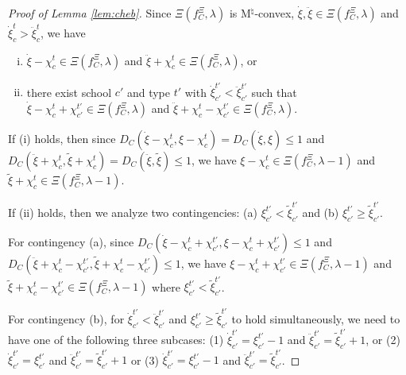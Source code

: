 \documentclass[12pt]{amsart}
\theoremstyle{remark}
\newcommand{\ieh}[1]{{\color{orange} IEH: #1 }}
\newcommand{\fk}[1]{{\color{red} FK: #1 }}
\begin{document}
\begin{proof}[Proof of Lemma \ref{lem:cheb}]
Since $\Xi(f_C^{\Xi},\lambda)$ is M$^{\natural}$-convex, $\dot{\xi}, \ddot{\xi} \in \Xi(f_C^{\Xi},\lambda)$ and $\dot{\xi}_c^t>\ddot{\xi}_c^t$, we have

\begin{enumerate}[(i)]
\item $\dot{\xi}-\chi_c^t \in \Xi(f_C^{\Xi},\lambda)$ and $\ddot{\xi}+\chi_c^t \in \Xi(f_C^{\Xi},\lambda)$, or
\item there exist school $c'$ and type $t'$  with $\dot{\xi}_{c'}^{t'}<\ddot{\xi}_{c'}^{t'}$ such that
$\dot{\xi}-\chi_c^t+\chi_{c'}^{t'} \in \Xi(f_C^{\Xi},\lambda)$ and $\ddot{\xi}+\chi_c^t-\chi_{c'}^{t'}\in \Xi(f_C^{\Xi},\lambda)$.
\end{enumerate}

If (i) holds, then since $D_C(\dot{\xi}-\chi_c^t,\xi-\chi_c^t)=D_C(\dot{\xi},\xi) \leq 1$
and $D_C(\ddot{\xi}+\chi_c^t,\tilde{\xi}+\chi_c^t)=D_C(\ddot{\xi},\tilde{\xi}) \leq 1$, we have $\xi-\chi_c^t \in \Xi(f_C^{\Xi},\lambda-1)$ and $\tilde{\xi}+\chi_c^t \in \Xi(f_C^{\Xi},\lambda-1)$.

If (ii) holds, then we analyze two contingencies: (a) $\xi_{c'}^{t'}<\tilde{\xi}_{c'}^{t'}$ and (b) $\xi_{c'}^{t'} \geq \tilde{\xi}_{c'}^{t'}$.

For contingency (a), since $D_C(\dot{\xi}-\chi_c^t+\chi_{c'}^{t'} ,\xi-\chi_c^t+\chi_{c'}^{t'}) \leq 1$ and $D_C(\ddot{\xi}+\chi_c^t-\chi_{c'}^{t'},\tilde{\xi}+\chi_c^t-\chi_{c'}^{t'}) \leq 1$, we have $\xi-\chi_c^t +\chi_{c'}^{t'}\in \Xi(f_C^{\Xi},\lambda-1)$ and $\tilde{\xi}+\chi_c^t-\chi_{c'}^{t'} \in \Xi(f_C^{\Xi},\lambda-1)$ where $\xi_{c'}^{t'}<\tilde{\xi}_{c'}^{t'}$.

For contingency (b), for $\dot{\xi}_{c'}^{t'}<\ddot{\xi}_{c'}^{t'}$ and $\xi_{c'}^{t'} \geq \tilde{\xi}_{c'}^{t'}$ to hold simultaneously, we need to have one of the following three subcases: (1) $\dot{\xi}_{c'}^{t'} = \xi_{c'}^{t'}-1$ and $\ddot{\xi}_{c'}^{t'} = \tilde{\xi}_{c'}^{t'}+1$, or
(2) $\dot{\xi}_{c'}^{t'} = \xi_{c'}^{t'}$ and $\ddot{\xi}_{c'}^{t'} = \tilde{\xi}_{c'}^{t'}+1$ or (3) $\dot{\xi}_{c'}^{t'} = \xi_{c'}^{t'}-1$ and $\ddot{\xi}_{c'}^{t'} = \tilde{\xi}_{c'}^{t'}$.


\end{proof}
\end{document}
